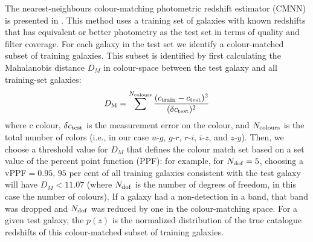 The nearest-neighbours colour-matching photometric redshift estimator (\textsc{CMNN}) is presented in \citet[][hereafter G18]{Graham:17}.
This method uses a training set of galaxies with known redshifts that has equivalent or better photometry as the test set in terms of quality and filter coverage.
For each galaxy in the test set we identify a colour-matched subset of training galaxies.
This subset is identified by first calculating the Mahalanobis distance $D_M$ in colour-space between the test galaxy and all training-set galaxies:
\begin{equation}
D_{\rm M} = \sum^{N_{\rm colours}}\frac{(c_{\rm train}-c_{\rm test})^2}{(\delta c_{\rm test})^2}
\end{equation}
where c colour, $\delta c_{\rm test}$ is the measurement error on the colour, and $N_{\rm colours}$ is the total number of colors (i.e., in our case $u$-$g$, $g$-$r$, $r$-$i$, $i$-$z$, and $z$-$y$).
Then, we choose a threshold value for $D_M$ that defines the colour match set based on a set value of the percent point function (PPF): for example, for $N_{\rm dof}=5$, choosing a vPPF$=0.95$, $95$ per cent of all training galaxies consistent with the test galaxy will have $D_M < 11.07$ (where $N_{\rm dof}$ is the number of degrees of freedom, in this case the number of colours).
If a galaxy had a non-detection in a band, that band was dropped and $N_{\rm dof}$ was reduced by one in the colour-matching space.
For a given test galaxy, the $p(z)$ is the normalized distribution of the true catalogue redshifts of this colour-matched subset of training galaxies.

